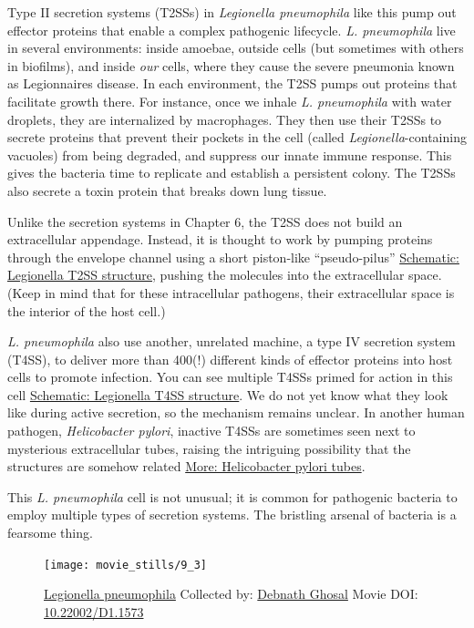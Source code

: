 \documentclass[]{tufte-book}
\begin{document}
Type II secretion systems (T2SSs) in \emph{Legionella pneumophila} like
this pump out effector proteins that enable a complex pathogenic
lifecycle. \emph{L. pneumophila} live in several environments: inside
amoebae, outside cells (but sometimes with others in biofilms), and
inside \emph{our} cells, where they cause the severe pneumonia known as
Legionnaires disease. In each environment, the T2SS pumps out proteins
that facilitate growth there. For instance, once we inhale \emph{L.
pneumophila} with water droplets, they are internalized by macrophages.
They then use their T2SSs to secrete proteins that prevent their pockets
in the cell (called \emph{Legionella}-containing vacuoles) from being
degraded, and suppress our innate immune response. This gives the
bacteria time to replicate and establish a persistent colony. The T2SSs
also secrete a toxin protein that breaks down lung tissue.

Unlike the secretion systems in Chapter 6, the T2SS does not build an
extracellular appendage. Instead, it is thought to work by pumping
proteins through the envelope channel using a short piston-like
``pseudo-pilus''
\protect\hyperlink{Legionella_T2SS_structure}{Schematic: Legionella T2SS
structure}, pushing the molecules into the extracellular space. (Keep in
mind that for these intracellular pathogens, their extracellular space
is the interior of the host cell.)

\emph{L. pneumophila} also use another, unrelated machine, a type IV
secretion system (T4SS), to deliver more than 400(!) different kinds of
effector proteins into host cells to promote infection. You can see
multiple T4SSs primed for action in this cell
\protect\hyperlink{Legionella_T4SS_structure}{Schematic: Legionella T4SS
structure}. We do not yet know what they look like during active
secretion, so the mechanism remains unclear. In another human pathogen,
\emph{Helicobacter pylori}, inactive T4SSs are sometimes seen next to
mysterious extracellular tubes, raising the intriguing possibility that
the structures are somehow related
\protect\hyperlink{Helicobacter_pylori_tubes}{More: Helicobacter pylori
tubes}.

This \emph{L. pneumophila} cell is not unusual; it is common for
pathogenic bacteria to employ multiple types of secretion systems. The
bristling arsenal of bacteria is a fearsome thing.





\begin{figure}
\texttt{[image: movie\_stills/9\_3]} \caption[\protect\hyperlink{tree}{Legionella pneumophila} Collected by:
\protect\hyperlink{debnath_ghosal}{Debnath Ghosal} Movie DOI:
\href{https://doi.org/10.22002/D1.1573}{10.22002/D1.1573}]{\protect\hyperlink{tree}{Legionella pneumophila} Collected by:
\protect\hyperlink{debnath_ghosal}{Debnath Ghosal} Movie DOI:
\href{https://doi.org/10.22002/D1.1573}{10.22002/D1.1573}}\label{fig:9-3}
\end{figure}
\end{document}
